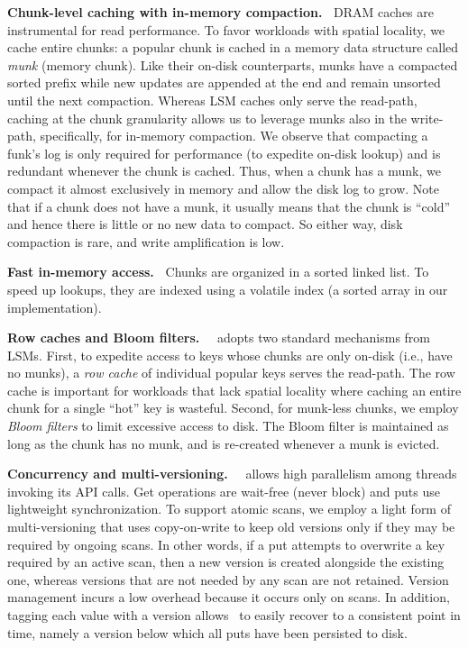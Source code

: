 {\bf Chunk-level caching with in-memory compaction.\ }
DRAM caches are instrumental for read performance. 
To favor workloads with spatial locality, we cache entire chunks:
a popular chunk is cached in a  memory data structure called \emph{munk} (memory chunk).
Like their on-disk counterparts, munks have a compacted sorted prefix while new updates are appended at the end and remain unsorted until the next compaction. 
Whereas LSM caches  only serve the read-path, caching at the chunk granularity allows us to 
leverage munks also in the write-path, specifically, for in-memory compaction.  
We observe that 
compacting a funk's log is only required for performance (to expedite on-disk lookup) and is redundant whenever the chunk is cached. Thus, when 
a chunk has a munk, we compact it almost exclusively in memory and allow the disk log to grow. 
Note that if a chunk does not have a munk, it usually means that the chunk is ``cold'' 
and hence there is little or no new data to compact. So either way,  disk compaction is rare, and write amplification is low.

{\bf Fast in-memory access.\ }
Chunks are organized in a sorted linked list. To speed up lookups, they are indexed using a volatile index (a sorted array in our implementation).  

 
 {\bf Row caches and Bloom filters.\ }
 \sys\ adopts two standard mechanisms from LSMs. First, to expedite access to  keys whose chunks are only on-disk  (i.e., have no munks), 
a \emph{row cache} of individual popular keys serves the read-path. The row cache is important for workloads that lack
spatial locality where caching an entire chunk for a single ``hot'' key is wasteful. 
Second, for munk-less chunks, we employ \emph{Bloom filters} to limit excessive access to disk. 
The Bloom filter is maintained as long as the chunk has no munk, and is re-created whenever a munk is evicted.

{\bf Concurrency and multi-versioning.\ }
 \sys\ allows high parallelism among threads invoking its API calls. 
 Get operations are wait-free (never block) and puts use lightweight synchronization. 
 To support atomic scans, we  employ a light form of multi-versioning that uses 
copy-on-write to keep old versions only if they may be required by ongoing scans. 
In other words, if a put attempts to overwrite a key required by an active scan, then a new version is created alongside the 
existing one, whereas versions that are not needed by any scan are not retained. 
Version management incurs a low overhead because it occurs only on scans. 
In addition, tagging each value with a version allows \sys\ to easily recover to a consistent point in time, namely a version below which all puts have been persisted to disk.


